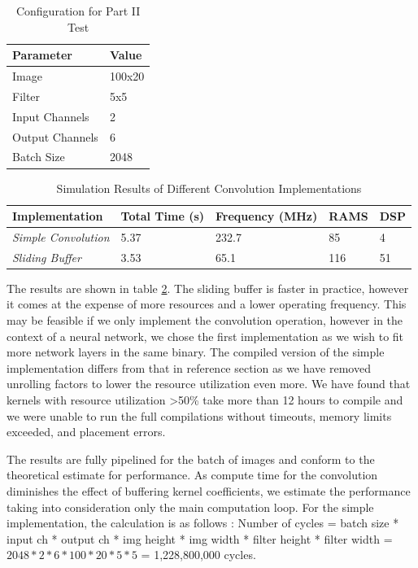 \begin{table}[]
\centering
\begin{tabular}{|l|l|}
\hline
\textbf{Parameter} & \textbf{Value} \\ \hline
Image              & 100x20          \\ \hline
Filter             & 5x5            \\ \hline
Input Channels     & 2             \\ \hline
Output Channels    & 6             \\ \hline
Batch Size         & 2048           \\ \hline
\end{tabular}
\caption{Configuration for Part II Test}
\label{tab:l3params}
\end{table}

\begin{table}[]
\begin{tabular}{|l|l|l|l|l|}
\hline
\textbf{Implementation}     & \textbf{Total Time (s)} & \textbf{Frequency (MHz)} & \textbf{RAMS} & \textbf{DSP} \\ \hline
\textit{Simple Convolution} & 5.37                    & 232.7                    & 85            & 4            \\ \hline
\textit{Sliding Buffer}     & 3.53                    & 65.1                     & 116           & 51           \\ \hline
\end{tabular}
\label{tab:resultptwo}
\caption{Simulation Results of Different Convolution Implementations }
\end{table}

The results are shown in table \ref{tab:resultptwo}. The sliding buffer is faster in practice, however it comes at the expense of more resources and a lower operating frequency. This may be feasible if we only implement the convolution operation, however in the context of a neural network, we chose the first implementation as we wish to fit more network layers in the same binary. The compiled version of the simple implementation differs from that in reference section as we have removed unrolling factors to lower the resource utilization even more. We have found that kernels with resource utilization >50\% take more than 12 hours to compile and we were unable to run the full compilations without timeouts, memory limits exceeded, and placement errors. 

The results are fully pipelined for the batch of images and conform to the theoretical estimate for performance. As compute time for the convolution diminishes the effect of buffering kernel coefficients, we estimate the performance taking into consideration only the main computation loop. For the simple implementation, the calculation is as follows : \newline Number of cycles = batch size * input ch * output ch * img height * img width * filter height * filter width  = $2048 * 2 * 6 * 100 * 20 * 5 * 5 $ = 1,228,800,000 cycles. 

